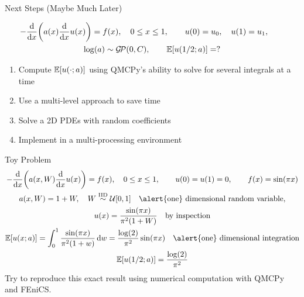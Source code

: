 \documentclass[11pt,compress,xcolor={usenames,dvipsnames},aspectratio=169]{beamer}
\DeclareMathOperator{\GP}{\mathcal{G} \! \mathcal{P}}
\newcounter{enumcont}
\begin{document}
\begin{frame}{Next Steps (Maybe Much Later)}

\vspace{-8ex}
\begin{gather*}
-\frac{\dif }{\dif x}\biggl(a(x) \frac{\dif}{\dif x} u(x) \biggr) = f(x), \quad 0 \leq x \leq 1, \qquad
u(0) = u_0, \quad
u(1) = u_1, \qquad \\
\log(a) \sim \GP(0,C), \qquad \Ex[u(1/2;a)] = ?
\end{gather*}

\vspace{-3ex}
\begin{enumerate}
\setcounter{enumi}{\value{enumcont}}
    \item Compute $\operatorname{\mathbb{E}}[u(\cdot;a)]$ using QMCPy's ability to solve for several integrals at a time
    \item Use a multi-level approach to save time
    \item Solve a 2D PDEs with random coefficients
    \item Implement in a multi-processing environment
\end{enumerate}

    
\end{frame}

\begin{frame}{Toy Problem}
    \vspace{-8ex}
\begin{gather*}
-\frac{\dif }{\dif x}\biggl(a(x,W) \frac{\dif}{\dif x} u(x) \biggr) = f(x), \quad 0 \leq x \leq 1, \qquad
u(0) = u(1) = 0, \qquad  f(x) = \sin(\pi x)\\
a(x,W) = 1 + W, \quad W \IIDsim \cu[0,1] \quad \text{\alert{one} dimensional random variable}, \\
u(x) = \frac{\sin(\pi x)}{\pi^2 (1+W)} \quad \text{by inspection}\\ 
\Ex[u(x;a)] = \int_0^1 \frac{\sin(\pi x)}{\pi^2 (1+w)} \, \dif w = \frac{\log(2) }{\pi^2} \sin(\pi x) \quad \text{\alert{one} dimensional integration} \\ \Ex[u(1/2;a)] = \frac{\log(2) }{\pi^2}
\end{gather*}
Try to reproduce this exact result using numerical computation with QMCPy and FEniCS.

\end{frame}
\end{document}
